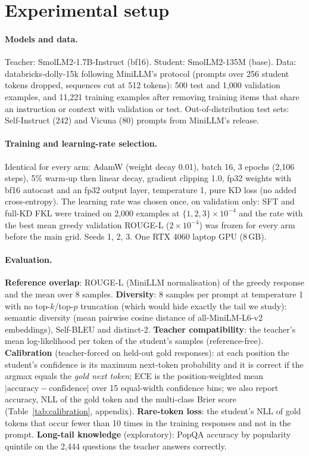 \documentclass[11pt]{article}
\begin{document}
\section{Experimental setup}\label{sec:setup}

\paragraph{Models and data.} Teacher: SmolLM2-1.7B-Instruct (bf16). Student: SmolLM2-135M (base). Data:
databricks-dolly-15k following MiniLLM's protocol (prompts over 256 student tokens dropped, sequences cut at 512
tokens): 500 test and 1,000 validation examples, and 11,221 training examples after removing training items that
share an instruction or context with validation or test. Out-of-distribution test sets: Self-Instruct (242) and
Vicuna (80) prompts from MiniLLM's release.

\paragraph{Training and learning-rate selection.} Identical for every arm: AdamW (weight decay 0.01), batch 16,
3 epochs (2,106 steps), 5\% warm-up then linear decay, gradient clipping 1.0, fp32 weights with bf16 autocast and
an fp32 output layer, temperature 1, pure KD loss (no added cross-entropy). The learning rate was chosen once, on
validation only: SFT and full-KD FKL were trained on 2,000 examples at $\{1,2,3\}\times10^{-4}$ and the rate with
the best mean greedy validation ROUGE-L ($2\times10^{-4}$) was frozen for every arm before the main grid. Seeds 1,
2, 3. One RTX 4060 laptop GPU (8\,GB).

\paragraph{Evaluation.}\label{sec:eval}
\textbf{Reference overlap}: ROUGE-L (MiniLLM normalisation) of the greedy response and the mean over 8 samples.
\textbf{Diversity}: 8 samples per prompt at temperature 1 with no top-$k$/top-$p$ truncation (which would hide
exactly the tail we study): semantic diversity (mean pairwise cosine distance of all-MiniLM-L6-v2 embeddings),
Self-BLEU and distinct-2. \textbf{Teacher compatibility}: the teacher's mean log-likelihood per token of the
student's samples (reference-free). \textbf{Calibration} (teacher-forced on held-out gold responses): at each
position the student's confidence is its maximum next-token probability and it is correct if the argmax equals
the \emph{gold next token}; ECE is the position-weighted mean $|\text{accuracy}-\text{confidence}|$ over 15
equal-width confidence bins; we also report accuracy, NLL of the gold token and the multi-class Brier score
(Table~\ref{tab:calibration}, appendix). \textbf{Rare-token loss}: the student's NLL of gold tokens that occur fewer
than 10 times in the training responses and not in the prompt. \textbf{Long-tail knowledge} (exploratory): PopQA
accuracy by popularity quintile on the 2,444 questions the teacher answers correctly.
\end{document}
